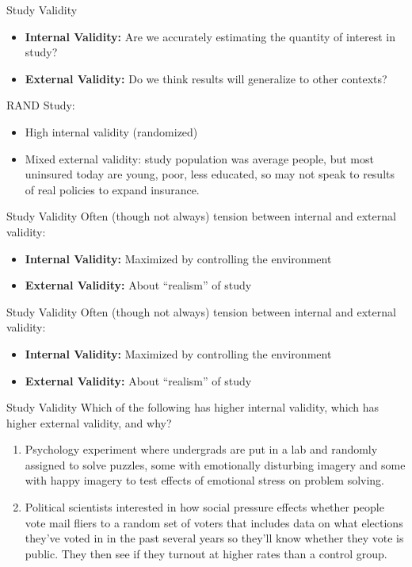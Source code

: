 \documentclass[11pt,handout]{beamer}
\begin{document}
\begin{frame}[c]{Study Validity}
  \begin{itemize}
    \item \textbf{Internal Validity:} Are we accurately estimating the quantity of interest in study?
    \item \textbf{External Validity:} Do we think results will generalize to other contexts?
  \end{itemize}
\pause RAND Study:
\begin{itemize}
  \item High internal validity (randomized)
  \item Mixed external validity: study population was average people, but most uninsured today are young, poor, less educated, so may not speak to results of real policies to expand insurance.
\end{itemize}
\end{frame}

\begin{frame}[c]{Study Validity}
Often (though not always) tension between internal and external validity:
  \begin{itemize}
    \item \textbf{Internal Validity:} Maximized by controlling the environment
    \item \textbf{External Validity:} About ``realism'' of study
  \end{itemize}
\end{frame}

\begin{frame}[c]{Study Validity}
Often (though not always) tension between internal and external validity:
  \begin{itemize}
    \pause \item \textbf{Internal Validity:} Maximized by controlling the environment
    \item \textbf{External Validity:} About ``realism'' of study
  \end{itemize}
\end{frame}

\begin{frame}[c]{Study Validity}
Which of the following has higher internal validity, which has higher external validity, and why?
\begin{enumerate}
  \item Psychology experiment where undergrads are put in a lab and randomly assigned to solve puzzles, some with emotionally disturbing imagery and some with happy imagery to test effects of emotional stress on problem solving.
  \item Political scientists interested in how social pressure effects whether people vote mail fliers to a random set of voters that includes data on what elections they've voted in in the past several years so they'll know whether they vote is public. They then see if they turnout at higher rates than a control group.
\end{enumerate}
\end{frame}
\end{document}
